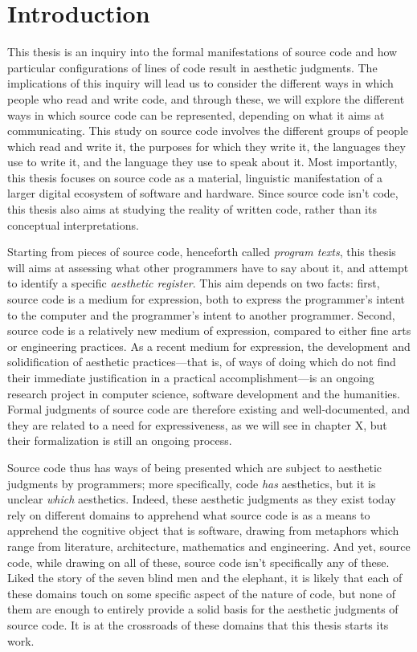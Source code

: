 \section{Introduction}

This thesis is an inquiry into the formal manifestations of source code and how particular configurations of lines of code result in aesthetic judgments. The implications of this inquiry will lead us to consider the different ways in which people who read and write code, and through these, we will explore the different ways in which source code can be represented, depending on what it aims at communicating.
This study on source code involves the different groups of people which read and write it, the purposes for which they write it, the languages they use to write it, and the language they use to speak about it. Most importantly, this thesis focuses on source code as a material, linguistic manifestation of a larger digital ecosystem of software and hardware. Since source code isn't code, this thesis also aims at studying the reality of written code, rather than its conceptual interpretations.

Starting from pieces of source code, henceforth called \emph{program texts}\cite{detienne_software_2012}, this thesis will aims at assessing what other programmers have to say about it, and attempt to identify a specific \emph{aesthetic register}. This aim depends on two facts: first, source code is a medium for expression, both to express the programmer's intent to the computer\cite{dijkstra_chapter_1972} and the programmer's intent to another programmer\cite{abelson_structure_1979}. Second, source code is a relatively new medium of expression, compared to either fine arts or engineering practices. As a recent medium for expression, the development and solidification of aesthetic practices—that is, of ways of doing which do not find their immediate justification in a practical accomplishment—is an ongoing research project in computer science, software development and the humanities. Formal judgments of source code are therefore existing and well-documented, and they are related to a need for expressiveness, as we will see in chapter X, but their formalization is still an ongoing process.

Source code thus has ways of being presented which are subject to aesthetic judgments by programmers; more specifically, code \emph{has} aesthetics, but it is unclear \emph{which} aesthetics. Indeed, these aesthetic judgments as they exist today rely on different domains to apprehend what source code is as a means to apprehend the cognitive object that is software, drawing from metaphors which range from literature, architecture, mathematics and engineering. And yet, source code, while drawing on all of these, source code isn't specifically any of these. Liked the story of the seven blind men and the elephant\cite{chun_sourcery_2008}, it is likely that each of these domains touch on some specific aspect of the nature of code, but none of them are enough to entirely provide a solid basis for the aesthetic judgments of source code. It is at the crossroads of these domains that this thesis starts its work.

